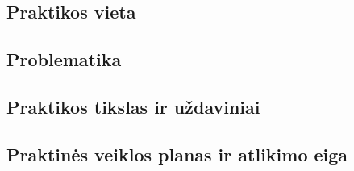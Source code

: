 
\subsection*{Praktikos vieta}

\subsection*{Problematika}

\subsection*{Praktikos tikslas ir uždaviniai}

\subsection*{Praktinės veiklos planas ir atlikimo eiga}
